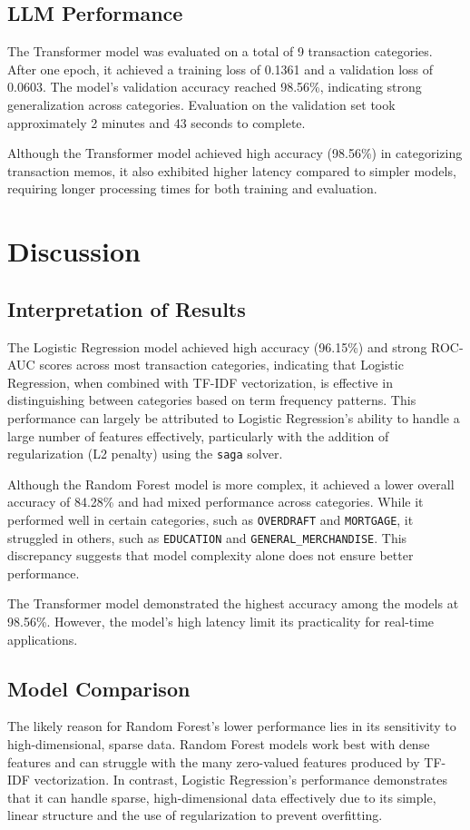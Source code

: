 \documentclass[12pt,letterpaper]{article}
\begin{document}
\subsection{LLM Performance}
The Transformer model was evaluated on a total of 9 transaction categories. After one epoch, it achieved a training loss of 0.1361 and a validation loss of 0.0603. The model’s validation accuracy reached 98.56\%, indicating strong generalization across categories. Evaluation on the validation set took approximately 2 minutes and 43 seconds to complete.

Although the Transformer model achieved high accuracy (98.56\%) in categorizing transaction memos, it also exhibited higher latency compared to simpler models, requiring longer processing times for both training and evaluation.

\section{Discussion}
\subsection{Interpretation of Results}

The Logistic Regression model achieved high accuracy (96.15\%) and strong ROC-AUC scores across most transaction categories, indicating that Logistic Regression, when combined with TF-IDF vectorization, is effective in distinguishing between categories based on term frequency patterns. This performance can largely be attributed to Logistic Regression's ability to handle a large number of features effectively, particularly with the addition of regularization (L2 penalty) using the \texttt{saga} solver.

Although the Random Forest model is more complex, it achieved a lower overall accuracy of 84.28\% and had mixed performance across categories. While it performed well in certain categories, such as \texttt{OVERDRAFT} and \texttt{MORTGAGE}, it struggled in others, such as \texttt{EDUCATION} and \texttt{GENERAL\_MERCHANDISE}. This discrepancy suggests that model complexity alone does not ensure better performance.

The Transformer model demonstrated the highest accuracy among the models at 98.56\%. However, the model’s high latency limit its practicality for real-time applications. 

\subsection{Model Comparison}
The likely reason for Random Forest’s lower performance lies in its sensitivity to high-dimensional, sparse data. Random Forest models work best with dense features and can struggle with the many zero-valued features produced by TF-IDF vectorization. In contrast, Logistic Regression’s performance demonstrates that it can handle sparse, high-dimensional data effectively due to its simple, linear structure and the use of regularization to prevent overfitting.
\end{document}
